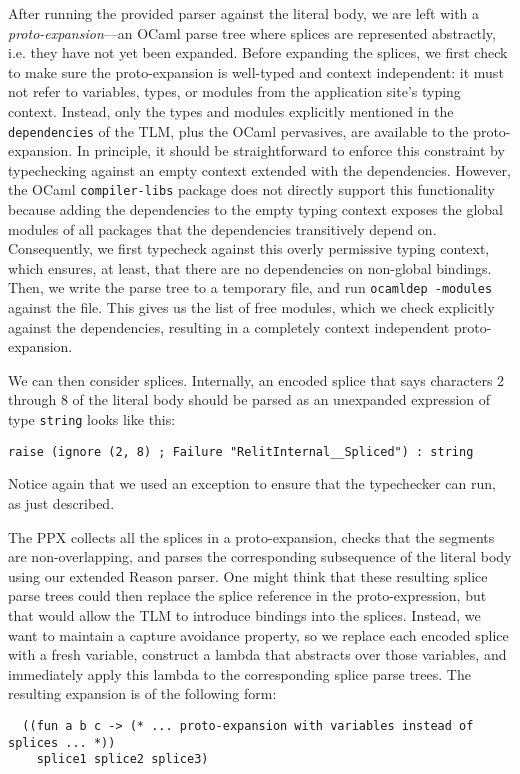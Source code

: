 \documentclass[acmsmall,review]{acmart}
\newcommand{\li}[1]{\lstinline[basicstyle=\ttfamily\fontsize{9pt}{1em}\selectfont]{#1}}
\theoremstyle{slplain}
\numberwithin{thm}{section}
\begin{document}
After running the provided parser against the literal body, we are left with a \emph{proto-expansion}---an OCaml parse tree where splices are represented abstractly, i.e. they have not yet been expanded. Before expanding the splices, we first check to make sure the proto-expansion is well-typed and context independent: it must not refer to variables, types, or modules from the application site's typing context. Instead, only the types and modules explicitly mentioned in the \li{dependencies} of the TLM, plus the OCaml pervasives, are available to the proto-expansion. In principle, it should be straightforward to enforce this constraint by typechecking against an empty context extended with the dependencies. However, the OCaml \li{compiler-libs} package does not directly support this functionality because adding the dependencies to the empty typing context exposes the global modules of all packages that the dependencies transitively depend on. 
Consequently, we first typecheck against this overly permissive typing context, which ensures, at least, that there are no dependencies on non-global bindings. Then, we write the parse tree to a temporary file, and run \li{ocamldep -modules} against the file. This gives us the list of free modules, which we check explicitly against the dependencies, resulting in a completely context independent proto-expansion.

We can then consider splices. Internally, an encoded splice that says characters 2 through 8 of the literal body should be parsed as an unexpanded expression of type \li{string} looks like this:
\begin{lstlisting}[numbers=none]
  raise (ignore (2, 8) ; Failure "RelitInternal__Spliced") : string
\end{lstlisting}
Notice again that we used an exception to ensure that the typechecker can run, as just described. 

The PPX collects all the splices in a proto-expansion, checks that the segments are non-overlapping, and parses the corresponding subsequence of the literal body using our extended Reason parser. One might think that these resulting splice parse trees could then replace the splice reference in the proto-expression, but that would allow the TLM to introduce bindings into the splices. Instead, we want to maintain a capture avoidance property, so we replace each encoded splice with a fresh variable, construct a lambda that abstracts over those variables, and immediately apply this lambda to the corresponding splice parse trees. The resulting expansion is of the following form:
\begin{lstlisting}
  ((fun a b c -> (* ... proto-expansion with variables instead of splices ... *)) 
    splice1 splice2 splice3)
\end{lstlisting}
\end{document}
